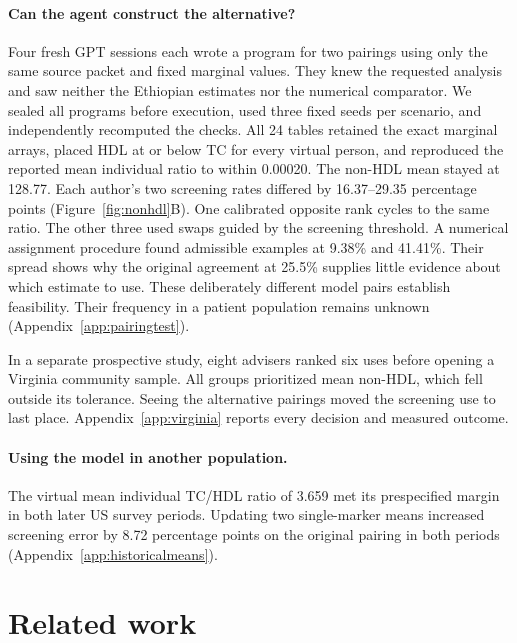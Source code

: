 \documentclass[sigconf,anonymous,review]{acmart}
\begin{document}
\paragraph{Can the agent construct the alternative?}

Four fresh GPT sessions each wrote a program for two pairings using only the same source packet and fixed marginal values. They knew the requested analysis and saw neither the Ethiopian estimates nor the numerical comparator. We sealed all programs before execution, used three fixed seeds per scenario, and independently recomputed the checks. All 24 tables retained the exact marginal arrays, placed HDL at or below TC for every virtual person, and reproduced the reported mean individual ratio to within 0.00020. The non-HDL mean stayed at 128.77. Each author's two screening rates differed by 16.37--29.35 percentage points (Figure~\ref{fig:nonhdl}B). One calibrated opposite rank cycles to the same ratio. The other three used swaps guided by the screening threshold. A numerical assignment procedure found admissible examples at 9.38\% and 41.41\%. Their spread shows why the original agreement at 25.5\% supplies little evidence about which estimate to use. These deliberately different model pairs establish feasibility. Their frequency in a patient population remains unknown (Appendix~\ref{app:pairingtest}).

In a separate prospective study, eight advisers ranked six uses before opening a Virginia community sample. All groups prioritized mean non-HDL, which fell outside its tolerance. Seeing the alternative pairings moved the screening use to last place. Appendix~\ref{app:virginia} reports every decision and measured outcome.

\paragraph{Using the model in another population.}
The virtual mean individual TC/HDL ratio of 3.659 met its prespecified margin in both later US survey periods. Updating two single-marker means increased screening error by 8.72 percentage points on the original pairing in both periods (Appendix~\ref{app:historicalmeans}).

\section{Related work}
\end{document}
